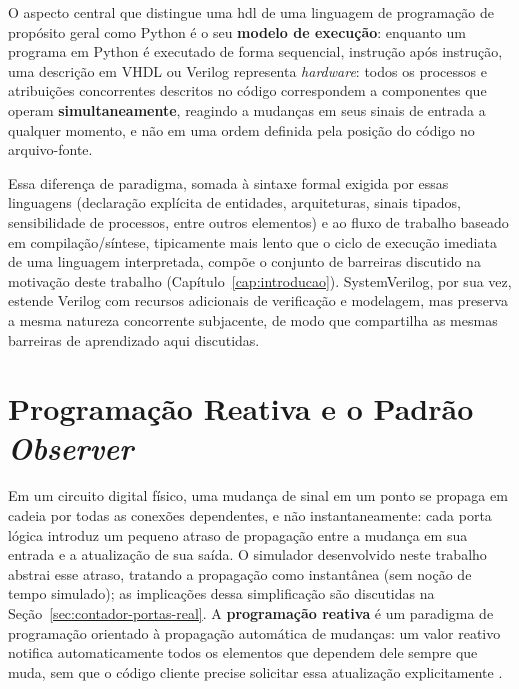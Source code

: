 O aspecto central que distingue uma \gls{hdl} de uma linguagem de programação de propósito geral como Python é o seu \textbf{modelo de execução}: enquanto um programa em Python é executado de forma sequencial, instrução após instrução, uma descrição em VHDL ou Verilog representa \textit{hardware}: todos os processos e atribuições concorrentes descritos no código correspondem a componentes que operam \textbf{simultaneamente}, reagindo a mudanças em seus sinais de entrada a qualquer momento, e não em uma ordem definida pela posição do código no arquivo-fonte.

Essa diferença de paradigma, somada à sintaxe formal exigida por essas linguagens (declaração explícita de entidades, arquiteturas, sinais tipados, sensibilidade de processos, entre outros elementos) e ao fluxo de trabalho baseado em compilação/síntese, tipicamente mais lento que o ciclo de execução imediata de uma linguagem interpretada, compõe o conjunto de barreiras discutido na motivação deste trabalho (Capítulo~\ref{cap:introducao}). SystemVerilog, por sua vez, estende Verilog com recursos adicionais de verificação e modelagem, mas preserva a mesma natureza concorrente subjacente, de modo que compartilha as mesmas barreiras de aprendizado aqui discutidas.

\section{Programação Reativa e o Padrão \textit{Observer}}
\label{sec:reativo}

Em um circuito digital físico, uma mudança de sinal em um ponto se propaga em cadeia por todas as conexões dependentes, e não instantaneamente: cada porta lógica introduz um pequeno atraso de propagação entre a mudança em sua entrada e a atualização de sua saída. O simulador desenvolvido neste trabalho abstrai esse atraso, tratando a propagação como instantânea (sem noção de tempo simulado); as implicações dessa simplificação são discutidas na Seção~\ref{sec:contador-portas-real}. A \textbf{programação reativa} é um paradigma de programação orientado à propagação automática de mudanças: um valor reativo notifica automaticamente todos os elementos que dependem dele sempre que muda, sem que o código cliente precise solicitar essa atualização explicitamente \cite{bainomugisha2013}.

